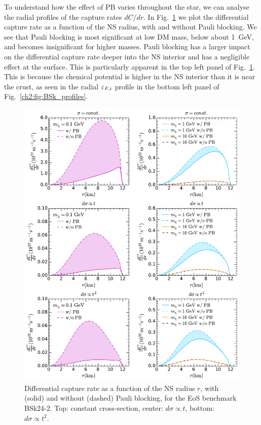To understand how the effect of PB varies throughout the star, we can analyse the radial profiles of the capture rates $dC/dr$.
In Fig.~\ref{ch3:fig:diffcap} we plot the differential capture rate as a function of the NS radius, with and without Pauli blocking. We see that Pauli blocking is most significant at low DM mass, below about 1~GeV, and becomes insignificant for higher masses. Pauli blocking has a larger impact on the differential capture rate deeper into the NS interior and has a negligible effect at the surface. This is particularly apparent in the top left panel of Fig.~\ref{ch3:fig:diffcap}. This is because the chemical potential is higher in the NS interior than it is near the crust, as seen in the radial $\varepsilon_{F,i}$ profile in the bottom left panel of Fig.~\ref{ch2:fig:BSk_profiles}.

\begin{figure}
    \centering
    \includegraphics[width=.85\textwidth]{capture_1/diff_cap_rate.pdf}        
    \caption{Differential capture rate as a function of the NS radius $r$, with (solid) and without (dashed) Pauli blocking, for the EoS benchmark BSk24-2. Top: constant cross-section, center: $d\sigma\propto t$, bottom: $d\sigma\propto t^2$.}
    \label{ch3:fig:diffcap}
\end{figure}

